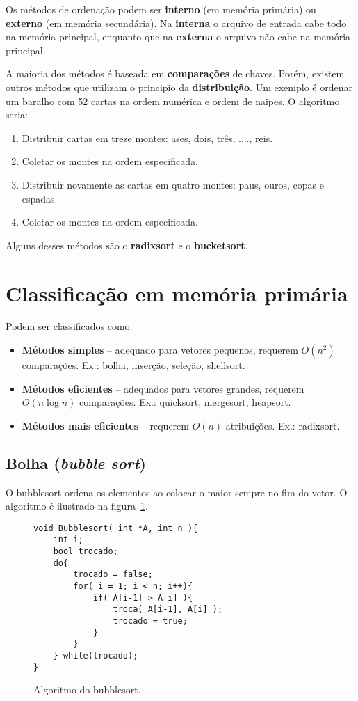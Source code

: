 Os métodos de ordenação podem ser {\bf interno} (em memória primária) ou {\bf externo} (em memória secundária).
Na {\bf interna} o arquivo de entrada cabe todo na memória principal, enquanto
que na {\bf externa} o arquivo não cabe na memória principal. 

A maioria dos métodos é baseada em {\bf comparações} de chaves.
Porém, existem outros métodos que utilizam o principio da {\bf distribuição}. 
Um exemplo é ordenar um baralho com 52 cartas na ordem numérica e ordem de naipes.
O algoritmo seria:
\begin{enumerate}
\item Distribuir cartas em treze montes: ases, dois, três, ...., reis.
\item Coletar os montes na ordem especificada.
\item Distribuir novamente as cartas em quatro montes: paus, ouros, copas e espadas.
\item Coletar os montes na ordem especificada.
\end{enumerate}
Alguns desses métodos são o {\bf radixsort} e o {\bf bucketsort}.

\section{Classificação em memória primária}

Podem ser classificados como:
\begin{itemize}
\item {\bf Métodos simples} -- adequado para vetores pequenos, requerem $O(n^2)$ comparações.
Ex.: bolha, inserção, seleção, shellsort.
\item {\bf Métodos eficientes} -- adequados para vetores grandes, requerem $O(n \log n)$ comparações.
Ex.: quicksort, mergesort, heapsort.
\item {\bf Métodos mais eficientes} -- requerem $O(n)$ atribuições. Ex.: radixsort.
\end{itemize}

\subsection{Bolha (\emph{bubble sort})}

O bubblesort ordena os elementos ao colocar o maior sempre no fim do vetor.
O algoritmo é ilustrado na figura~\ref{aula03:algo:bubblesort}.
\begin{figure}[!htb]
\centering
\begin{framed}
\begin{lstlisting}
void Bubblesort( int *A, int n ){
	int i;
	bool trocado;
	do{
		trocado = false;
		for( i = 1; i < n; i++){
			if( A[i-1] > A[i] ){
				troca( A[i-1], A[i] );
				trocado = true;
			}
		}
	} while(trocado);
}
\end{lstlisting}
\end{framed}
\caption{Algoritmo do bubblesort.}
\label{aula03:algo:bubblesort}
\end{figure}

